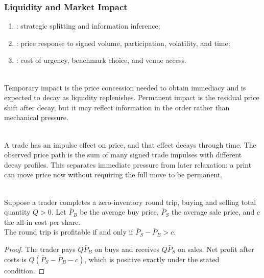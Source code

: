 \subsubsection{Liquidity and Market Impact}

\begin{taxonomy} 
\begin{enumerate}[label=\roman*.]
\setlength{\itemsep}{0pt}
\item {}: strategic splitting and information inference;
\item {}: price response to signed volume, participation, volatility, and time;
\item {}: cost of urgency, benchmark choice, and venue access.
\end{enumerate}
\end{taxonomy}

\begin{definition} \\
Temporary impact is the price concession needed to obtain immediacy and is expected to decay as liquidity replenishes. Permanent impact is the residual price shift after decay, but it may reflect information in the order rather than mechanical pressure.
\end{definition}

\begin{mechanism} \\
A trade has an impulse effect on price, and that effect decays through time. The observed price path is the sum of many signed trade impulses with different decay profiles. This separates immediate pressure from later relaxation: a print can move price now without requiring the full move to be permanent.
\end{mechanism}

\begin{proposition} \\
Suppose a trader completes a zero-inventory round trip, buying and selling total quantity $Q>0$. Let $\bar{P}_B$ be the average buy price, $\bar{P}_S$ the average sale price, and $c$ the all-in cost per share.\\
The round trip is profitable if and only if $\bar{P}_S-\bar{P}_B>c$.
\begin{proof}
The trader pays $Q\bar{P}_B$ on buys and receives $Q\bar{P}_S$ on sales. Net profit after costs is $Q(\bar{P}_S-\bar{P}_B-c)$, which is positive exactly under the stated condition.
\end{proof}
\end{proposition}

